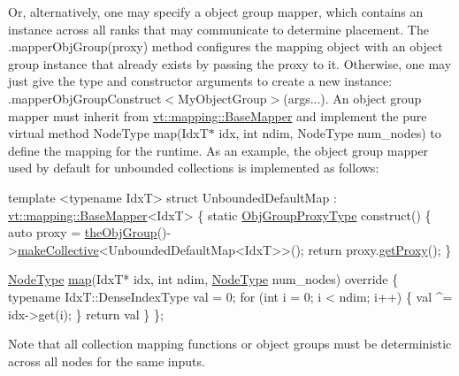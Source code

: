 Or, alternatively, one may specify a object group mapper, which contains an instance across all ranks that may communicate to determine placement. The {\ttfamily .mapper\+Obj\+Group(proxy)} method configures the mapping object with an object group instance that already exists by passing the proxy to it. Otherwise, one may just give the type and constructor arguments to create a new instance\+: {\ttfamily .mapper\+Obj\+Group\+Construct$<$My\+Object\+Group$>$(args...)}. An object group mapper must inherit from {\ttfamily \hyperlink{structvt_1_1mapping_1_1_base_mapper}{vt\+::mapping\+::\+Base\+Mapper}} and implement the pure virtual method {\ttfamily Node\+Type map(\+Idx\+T$\ast$ idx, int ndim, Node\+Type num\+\_\+nodes)} to define the mapping for the runtime. As an example, the object group mapper used by default for unbounded collections is implemented as follows\+:


\begin{DoxyCode}
\textcolor{keyword}{template} <\textcolor{keyword}{typename} IdxT>
\textcolor{keyword}{struct }UnboundedDefaultMap : \hyperlink{structvt_1_1mapping_1_1_base_mapper}{vt::mapping::BaseMapper}<IdxT> \{
  \textcolor{keyword}{static} \hyperlink{namespacevt_ad7cae989df485fccca57f0792a880a8e}{ObjGroupProxyType} construct() \{
    \textcolor{keyword}{auto} proxy = \hyperlink{namespacevt_a833f0115b692f578167cbd88e30d39c5}{theObjGroup}()->\hyperlink{structvt_1_1objgroup_1_1_obj_group_manager_a651c44a47c6bcdc9f1b6c9e857fa03f2}{makeCollective}<UnboundedDefaultMap<IdxT>>();
    \textcolor{keywordflow}{return} proxy.\hyperlink{structvt_1_1objgroup_1_1proxy_1_1_proxy_a76cda2351cf7801abe2ebffa1403c5b8}{getProxy}();
  \}

  \hyperlink{namespacevt_a866da9d0efc19c0a1ce79e9e492f47e2}{NodeType} \hyperlink{structvt_1_1mapping_1_1_base_mapper_a940a3ea301c0f60b2b88218afbce5a4f}{map}(IdxT* idx, \textcolor{keywordtype}{int} ndim, \hyperlink{namespacevt_a866da9d0efc19c0a1ce79e9e492f47e2}{NodeType} num\_nodes)\textcolor{keyword}{ override }\{
    \textcolor{keyword}{typename} IdxT::DenseIndexType val = 0;
    \textcolor{keywordflow}{for} (\textcolor{keywordtype}{int} i = 0; i < ndim; i++) \{
      val ^= idx->get(i);
    \}
    \textcolor{keywordflow}{return} val %
  \}
\};
\end{DoxyCode}


Note that all collection mapping functions or object groups must be deterministic across all nodes for the same inputs.

